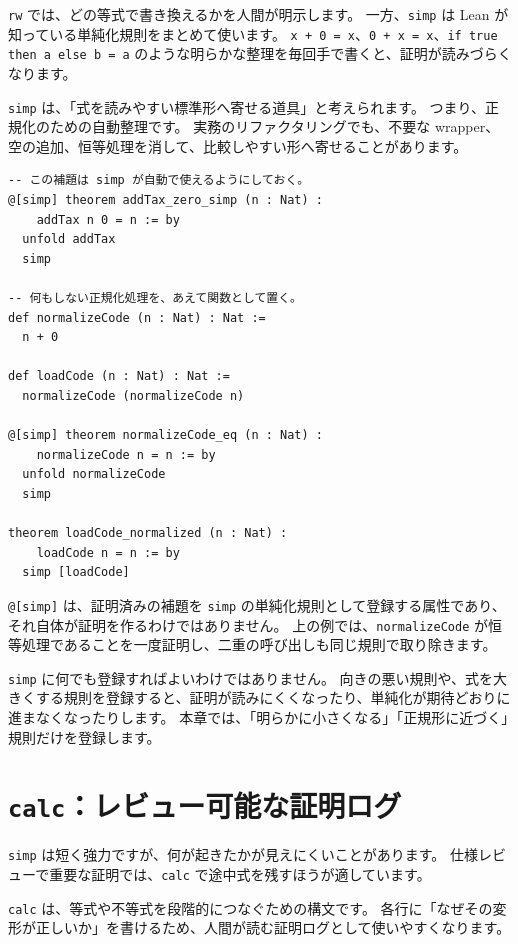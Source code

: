 \texttt{rw} では、どの等式で書き換えるかを人間が明示します。
一方、\texttt{simp} は Lean が知っている単純化規則をまとめて使います。
\texttt{x + 0 = x}、\texttt{0 + x = x}、\texttt{if true then a else b = a} のような明らかな整理を毎回手で書くと、証明が読みづらくなります。

\texttt{simp} は、「式を読みやすい標準形へ寄せる道具」と考えられます。
つまり、正規化のための自動整理です。
実務のリファクタリングでも、不要な wrapper、空の追加、恒等処理を消して、比較しやすい形へ寄せることがあります。

\begin{listing}[htbp]
\begin{verbatim}
-- この補題は simp が自動で使えるようにしておく。
@[simp] theorem addTax_zero_simp (n : Nat) :
    addTax n 0 = n := by
  unfold addTax
  simp

-- 何もしない正規化処理を、あえて関数として置く。
def normalizeCode (n : Nat) : Nat :=
  n + 0

def loadCode (n : Nat) : Nat :=
  normalizeCode (normalizeCode n)

@[simp] theorem normalizeCode_eq (n : Nat) :
    normalizeCode n = n := by
  unfold normalizeCode
  simp

theorem loadCode_normalized (n : Nat) :
    loadCode n = n := by
  simp [loadCode]
\end{verbatim}
\caption{\texttt{normalizeCode\_eq}}
\label{lst:ch18-simp}
\end{listing}

\texttt{@[simp]} は、証明済みの補題を \texttt{simp} の単純化規則として登録する属性であり、それ自体が証明を作るわけではありません。
上の例では、\texttt{normalizeCode} が恒等処理であることを一度証明し、二重の呼び出しも同じ規則で取り除きます。

\texttt{simp} に何でも登録すればよいわけではありません。
向きの悪い規則や、式を大きくする規則を登録すると、証明が読みにくくなったり、単純化が期待どおりに進まなくなったりします。
本章では、「明らかに小さくなる」「正規形に近づく」規則だけを登録します。

\section{\texttt{calc}：レビュー可能な証明ログ}

\texttt{simp} は短く強力ですが、何が起きたかが見えにくいことがあります。
仕様レビューで重要な証明では、\texttt{calc} で途中式を残すほうが適しています。

\texttt{calc} は、等式や不等式を段階的につなぐための構文です。
各行に「なぜその変形が正しいか」を書けるため、人間が読む証明ログとして使いやすくなります。

